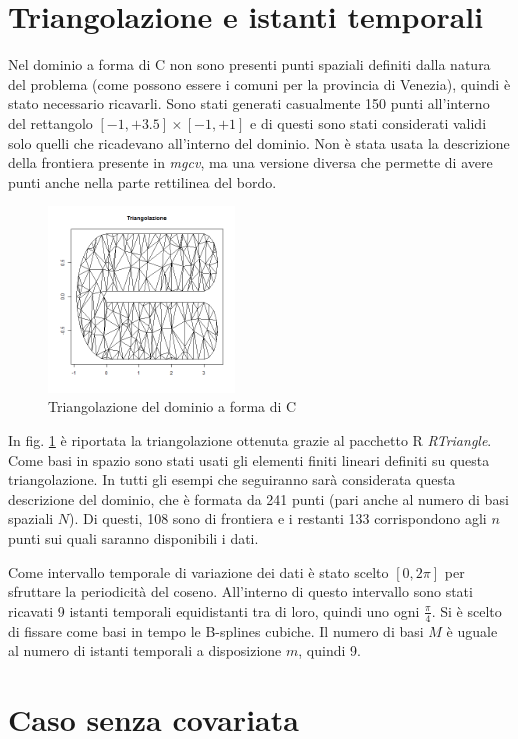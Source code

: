 \documentclass[a4paper,11pt,twoside,openright]{book}							%
\begin{document}
\section{Triangolazione e istanti temporali}
Nel dominio a forma di C non sono presenti punti spaziali definiti dalla natura del problema (come possono essere i comuni per la provincia di Venezia), quindi è stato necessario ricavarli. Sono stati generati casualmente 150 punti all'interno del rettangolo $[-1,+3.5] \times [-1,+1]$ e di questi sono stati considerati validi solo quelli che ricadevano all'interno del dominio. Non è stata usata la descrizione della frontiera presente in \textit{mgcv}, ma una versione diversa che permette di avere punti anche nella parte rettilinea del bordo.
\begin{figure}[t]
	\centering
	\includegraphics[width=0.44\textwidth]{Immagini/DomCinizio/DomC_Triangolazione.png}
	\caption{Triangolazione del dominio a forma di C}
	\label{fig:domC_triang}
\end{figure}
In fig. \ref{fig:domC_triang} è riportata la triangolazione ottenuta grazie al pacchetto R \textit{RTriangle}. Come basi in spazio sono stati usati gli elementi finiti lineari definiti su questa triangolazione. In tutti gli esempi che seguiranno sarà considerata questa descrizione del dominio, che è formata da 241 punti (pari anche al numero di basi spaziali $N$). Di questi, 108 sono di frontiera e i restanti 133 corrispondono agli $n$ punti sui quali saranno disponibili i dati.

Come intervallo temporale di variazione dei dati è stato scelto $[0,2\pi]$ per sfruttare la periodicità del coseno. All'interno di questo intervallo sono stati ricavati 9 istanti temporali equidistanti tra di loro, quindi uno ogni $\frac{\pi}{4}$. Si è scelto di fissare come basi in tempo le B-splines cubiche. Il numero di basi $M$ è uguale al numero di istanti temporali a disposizione $m$, quindi 9. 
\newpage
\section{Caso senza covariata}
\end{document}

